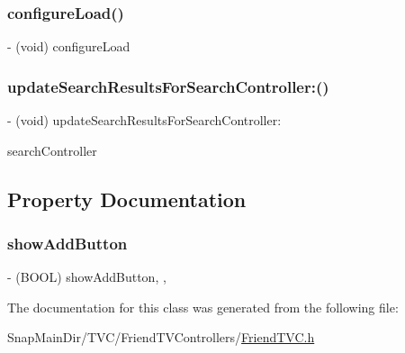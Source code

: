 \subsubsection{\texorpdfstring{configure\+Load()}{configureLoad()}}
{\footnotesize\ttfamily -\/ (void) configure\+Load \begin{DoxyParamCaption}{ }\end{DoxyParamCaption}}

\hypertarget{interface_friend_t_v_c_aa1e888a49829fec06f04c6f02320da0f}{}\label{interface_friend_t_v_c_aa1e888a49829fec06f04c6f02320da0f} 
\subsubsection{\texorpdfstring{update\+Search\+Results\+For\+Search\+Controller\+:()}{updateSearchResultsForSearchController:()}}
{\footnotesize\ttfamily -\/ (void) update\+Search\+Results\+For\+Search\+Controller\+: \begin{DoxyParamCaption}\item[{(U\+I\+Search\+Controller $\ast$)}]{search\+Controller }\end{DoxyParamCaption}}



\subsection{Property Documentation}
\hypertarget{interface_friend_t_v_c_ab0d6b7a92b9d8aa166f9c9a18d14a205}{}\label{interface_friend_t_v_c_ab0d6b7a92b9d8aa166f9c9a18d14a205} 
\subsubsection{\texorpdfstring{show\+Add\+Button}{showAddButton}}
{\footnotesize\ttfamily -\/ (B\+O\+OL) show\+Add\+Button\hspace{0.3cm}{\ttfamily [read]}, {\ttfamily [write]}, {\ttfamily [atomic]}}



The documentation for this class was generated from the following file\+:\begin{DoxyCompactItemize}
\item 
Snap\+Main\+Dir/\+T\+V\+C/\+Friend\+T\+V\+Controllers/\hyperlink{_friend_t_v_c_8h}{Friend\+T\+V\+C.\+h}\end{DoxyCompactItemize}

